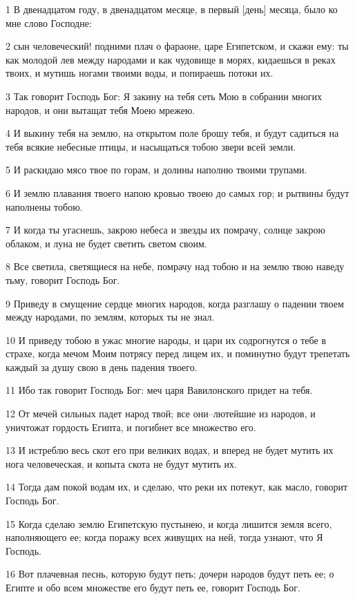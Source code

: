 \par 1 В двенадцатом году, в двенадцатом месяце, в первый [день] месяца, было ко мне слово Господне:
\par 2 сын человеческий! подними плач о фараоне, царе Египетском, и скажи ему: ты как молодой лев между народами и как чудовище в морях, кидаешься в реках твоих, и мутишь ногами твоими воды, и попираешь потоки их.
\par 3 Так говорит Господь Бог: Я закину на тебя сеть Мою в собрании многих народов, и они вытащат тебя Моею мрежею.
\par 4 И выкину тебя на землю, на открытом поле брошу тебя, и будут садиться на тебя всякие небесные птицы, и насыщаться тобою звери всей земли.
\par 5 И раскидаю мясо твое по горам, и долины наполню твоими трупами.
\par 6 И землю плавания твоего напою кровью твоею до самых гор; и рытвины будут наполнены тобою.
\par 7 И когда ты угаснешь, закрою небеса и звезды их помрачу, солнце закрою облаком, и луна не будет светить светом своим.
\par 8 Все светила, светящиеся на небе, помрачу над тобою и на землю твою наведу тьму, говорит Господь Бог.
\par 9 Приведу в смущение сердце многих народов, когда разглашу о падении твоем между народами, по землям, которых ты не знал.
\par 10 И приведу тобою в ужас многие народы, и цари их содрогнутся о тебе в страхе, когда мечом Моим потрясу перед лицем их, и поминутно будут трепетать каждый за душу свою в день падения твоего.
\par 11 Ибо так говорит Господь Бог: меч царя Вавилонского придет на тебя.
\par 12 От мечей сильных падет народ твой; все они--лютейшие из народов, и уничтожат гордость Египта, и погибнет все множество его.
\par 13 И истреблю весь скот его при великих водах, и вперед не будет мутить их нога человеческая, и копыта скота не будут мутить их.
\par 14 Тогда дам покой водам их, и сделаю, что реки их потекут, как масло, говорит Господь Бог.
\par 15 Когда сделаю землю Египетскую пустынею, и когда лишится земля всего, наполняющего ее; когда поражу всех живущих на ней, тогда узнают, что Я Господь.
\par 16 Вот плачевная песнь, которую будут петь; дочери народов будут петь ее; о Египте и обо всем множестве его будут петь ее, говорит Господь Бог.
